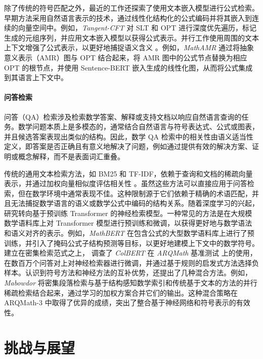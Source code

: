 \documentclass[11pt]{article}
\numberwithin{equation}{section}
\begin{document}
除了传统的符号匹配之外，最近的工作还探索了使用文本嵌入模型进行公式检索。早期方法采用自然语言表示的技术，通过线性化结构化的公式编码并将其嵌入到连续的向量空间中。例如，\textit{Tangent-CFT} \cite{10.1145/3341981.3344235} 对 SLT 和 OPT 进行深度优先遍历，标记生成的元组序列，并应用文本嵌入模型以获得公式表示。并行工作使用周围的文本上下文增强了公式表示，以更好地捕捉语义含义 \cite{10.1145/3511808.3557567,krstovski2018equation}。例如，\textit{MathAMR} \cite{10.1145/3511808.3557567} 通过将抽象意义表示（AMR）图与 OPT 结合起来，将 AMR 图中的公式节点替换为相应 OPT 的根节点，并使用 Sentence-BERT 嵌入生成的线性化图，从而将公式集成到其语言上下文中。

\paragraph{问答检索}

问答（QA）检索涉及检索数学答案、解释或支持文档以响应自然语言查询的任务。数学问题本质上是多模态的，通常结合自然语言与符号表达式、公式或图表，并且候选答案表现出类似的结构。因此，数学 QA 检索中的相关性由语义适当性定义，即答案是否正确且有意义地解决了问题，例如通过提供有效的解决方案、证明或概念解释，而不是表面词汇重叠。

传统的通用文本检索方法，如 BM25 \cite{robertson1995okapi,10.1561/1500000019} 和 TF-IDF，依赖于查询和文档的稀疏向量表示，并通过加权向量相似度评估相关性 \cite{SALTON1988513}。虽然这些方法可以直接应用于问答检索，但在数学环境中通常表现不佳。这种限制源于它们依赖于精确的术语匹配，并且无法捕捉数学语言的语义或数学公式中编码的结构关系。随着深度学习的兴起，研究转向基于预训练 Transformer 的神经检索模型。一种常见的方法是在大规模数学语料库上对 Transformer 模型进行预训练和微调，以获得更好地与数学语法和语义对齐的表示。例如，\textit{MathBERT} \cite{peng2021mathbert} 在包含公式的大型数学语料库上进行了预训练，并引入了掩码公式子结构预测等目标，以更好地建模上下文中的数学符号。建立在密集检索范式之上，\cite{reusch2021tu_dbs} 调查了 \textit{ColBERT} \cite{khattab2020colbert} 在 \textit{ARQMath} 基准测试 \cite{10.1007/978-3-030-85251-1_17,10.1007/978-3-030-58219-7_15} 上的使用，在数百万个问答对上对神经检索器进行微调，并通过基于规则的启发式方法选择负样本。认识到符号方法和神经方法的互补优势，还提出了几种混合方法。例如，\textit{Mabowdor} \cite{10.1145/3539618.3591746} 将密集段落检索与基于结构感知数学索引和传统基于文本的方法的并行稀疏检索结合起来，通过学习的加权方案合并它们的输出。这种混合策略在 ARQMath-3 \cite{Mansouri2022OverviewOA} 中取得了优异的成绩，突出了整合基于神经网络和符号表示的有效性。

\section{挑战与展望}\label{sec:cp}
\end{document}
